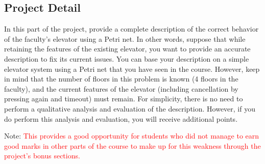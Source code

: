 \documentclass[12pt	]{article}
\begin{document}
\subsection{Project Detail}
In this part of the project, provide a complete description of the correct behavior of the faculty's elevator using a Petri net. In other words, suppose that while retaining the features of the existing elevator, you want to provide an accurate description to fix its current issues. You can base your description on a simple elevator system using a Petri net that you have seen in the course. However, keep in mind that the number of floors in this problem is known (4 floors in the faculty), and the current features of the elevator (including cancellation by pressing again and timeout) must remain. For simplicity, there is no need to perform a qualitative analysis and evaluation of the description. However, if you do perform this analysis and evaluation, you will receive additional points.

Note: \textcolor{red}{This provides a good opportunity for students who did not manage to earn good marks in other parts of the course to make up for this weakness through the project's bonus sections.}












\newpage


\end{document}

